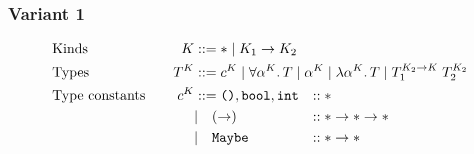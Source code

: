 \documentclass[acmsmall, 9pt]{article}
\begin{document}
\subsubsection{Variant 1}
\begin{align*}
  &\text{Kinds} \quad &K &::= * \; | \; K_1 \rightarrow K_2 \span\span\\
  &\text{Types} \quad &T^K &::= c^K \; | \; \forall \alpha^K . \, T\; | \; \alpha^K \; | \; \lambda \alpha^K. \, T \; |  \; T_1^{K_2 \rightarrow K} \; T_2^{K_2} \span\span\\
  &\text{Type constants} \quad &c^K &::= \texttt{()}, \texttt{bool}, \texttt{int} &::& \; *\\
  &&&| \quad (\rightarrow) &::& \; * \rightarrow * \rightarrow * \\
  &&&| \quad \texttt{Maybe} &::& \; * \rightarrow *
\end{align*}
\end{document}
